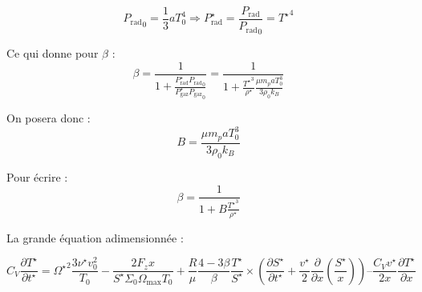 \begin{equation}
    {P_\mathrm{rad}}_0 = \frac{1}{3} a T_0^4 \Rightarrow P_\mathrm{rad}^\star = \frac{P_\mathrm{rad}}{{P_\mathrm{rad}}_0} = {T^\star}^4
\end{equation}

Ce qui donne pour $\beta$ :
\begin{equation}
    \beta = \frac{1}{1 + \frac{P_\mathrm{rad}^\star {P_\mathrm{rad}}_0}{P_\mathrm{gaz}^\star {P_\mathrm{gaz}}_0}} = \frac{1}{1 + \frac{{T^\star}^3}{\rho^\star} \frac{\mu m_p a T_0^3}{3 \rho_0 k_B}}
\end{equation}

On posera donc :
\begin{equation}
    B = \frac{\mu m_p a T_0^3}{3 \rho_0 k_B}
\end{equation}

Pour écrire :
\begin{equation}
    \beta = \frac{1}{1 + B \frac{{T^\star}^3}{\rho^\star}}
\end{equation}

La grande équation adimensionnée :

\begin{equation}
    C_V \frac{\partial T^{\star}}{\partial t^{\star}} =
    {\Omega^\star}^2 \frac{3 \nu^\star v_0^2}{T_0} - \frac{2 F_z x}{S^\star \Sigma_0 \Omega_\mathrm{max} T_0} +
    \frac{R}{\mu} \frac{4-3\beta}{\beta} \frac{T^\star}{S^\star} \times
    \left( \frac{\partial S^\star}{\partial t^\star} + \frac{v^\star}{2} \frac{\partial}{\partial x} \left(\frac{S^\star}{x}\right) \right) –
    \frac{C_V v^\star}{2 x} \frac{\partial T^\star}{\partial x}
\end{equation}

